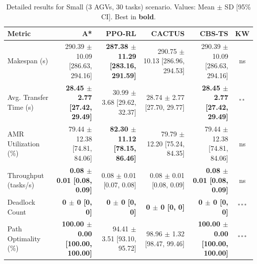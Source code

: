 \begin{table}[htbp]
\centering
\caption{Detailed results for Small (3 AGVs, 30 tasks) scenario. Values: Mean $\pm$ SD [95\% CI]. Best in \textbf{bold}.}
\label{tab:detail_s1_small}
\small
\begin{tabular}{@{}lrrrrc@{}}
\toprule
\textbf{Metric} & \textbf{A*} & \textbf{PPO-RL} & \textbf{CACTUS} & \textbf{CBS-TS} & \textbf{KW} \\
\midrule
Makespan (s) & 290.39 $\pm$ 10.09 [286.63, 294.16] & \textbf{287.38 $\pm$ 11.29 [283.16, 291.59]} & 290.75 $\pm$ 10.13 [286.96, 294.53] & 290.39 $\pm$ 10.09 [286.63, 294.16] & ns \\
Avg. Transfer Time (s) & \textbf{28.45 $\pm$ 2.77 [27.42, 29.49]} & 30.99 $\pm$ 3.68 [29.62, 32.37] & 28.74 $\pm$ 2.77 [27.70, 29.77] & \textbf{28.45 $\pm$ 2.77 [27.42, 29.49]} & $^{**}$ \\
AMR Utilization (\%) & 79.44 $\pm$ 12.38 [74.81, 84.06] & \textbf{82.30 $\pm$ 11.12 [78.15, 86.46]} & 79.79 $\pm$ 12.20 [75.24, 84.35] & 79.44 $\pm$ 12.38 [74.81, 84.06] & ns \\
Throughput (tasks/s) & \textbf{0.08 $\pm$ 0.01 [0.08, 0.09]} & 0.08 $\pm$ 0.01 [0.07, 0.08] & 0.08 $\pm$ 0.01 [0.08, 0.09] & \textbf{0.08 $\pm$ 0.01 [0.08, 0.09]} & ns \\
Deadlock Count & \textbf{0 $\pm$ 0 [0, 0]} & \textbf{0 $\pm$ 0 [0, 0]} & \textbf{0 $\pm$ 0 [0, 0]} & \textbf{0 $\pm$ 0 [0, 0]} & $^{***}$ \\
Path Optimality (\%) & \textbf{100.00 $\pm$ 0.00 [100.00, 100.00]} & 94.41 $\pm$ 3.51 [93.10, 95.72] & 98.96 $\pm$ 1.32 [98.47, 99.46] & \textbf{100.00 $\pm$ 0.00 [100.00, 100.00]} & $^{***}$ \\
\bottomrule
\end{tabular}
\end{table}